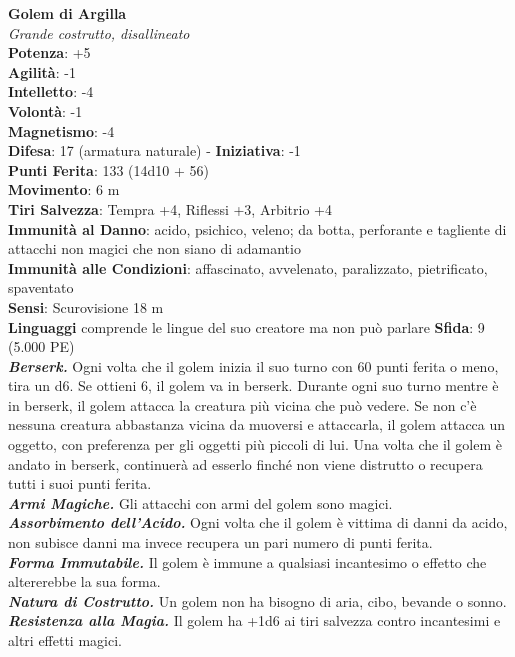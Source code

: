 \begin{multicols}{2}
\medskip\textbf{Golem di Argilla}\\
\emph{Grande costrutto, disallineato}\\
\textbf{Potenza}: +5\\
\textbf{Agilità}: -1\\
\textbf{Intelletto}: -4\\
\textbf{Volontà}: -1\\
\textbf{Magnetismo}: -4\\
\textbf{Difesa}: 17 (armatura naturale) - \textbf{Iniziativa}: -1\\
\textbf{Punti Ferita}: 133 (14d10 + 56)\\
\textbf{Movimento}: 6 m\\
\textbf{Tiri Salvezza}: Tempra +4, Riflessi +3, Arbitrio +4\\
\textbf{Immunità al Danno}: acido, psichico, veleno; da botta, perforante e tagliente di attacchi non magici che non siano di adamantio\\
\textbf{Immunità alle Condizioni}: affascinato, avvelenato, paralizzato, pietrificato, spaventato\\
\textbf{Sensi}: Scurovisione 18 m\\
\textbf{Linguaggi} comprende le lingue del suo creatore ma non può parlare
\textbf{Sfida}: 9 (5.000 PE)\smallskip\\
\emph{\textbf{Berserk.}} Ogni volta che il golem inizia il suo turno con 60 punti ferita o meno, tira un d6. Se ottieni 6, il golem va in berserk. Durante ogni suo turno mentre è in berserk, il golem attacca la creatura più vicina che può vedere. Se non c'è nessuna creatura abbastanza vicina da muoversi e attaccarla, il golem attacca un oggetto, con preferenza per gli oggetti più piccoli di lui. Una volta che il golem è andato in berserk, continuerà ad esserlo finché non viene distrutto o recupera tutti i suoi punti ferita.\\
\emph{\textbf{Armi Magiche.}} Gli attacchi con armi del golem sono magici.\\
\emph{\textbf{Assorbimento dell'Acido.}} Ogni volta che il golem è vittima di danni da acido, non subisce danni ma invece recupera un pari numero di punti ferita.\\
\emph{\textbf{Forma Immutabile.}} Il golem è immune a qualsiasi incantesimo o effetto che altererebbe la sua forma. \\
\emph{\textbf{Natura di Costrutto.}} Un golem non ha bisogno di aria, cibo, bevande o sonno.\\
\emph{\textbf{Resistenza alla Magia.}} Il golem ha +1d6 ai tiri salvezza contro incantesimi e altri effetti magici.\\

\end{multicols}
